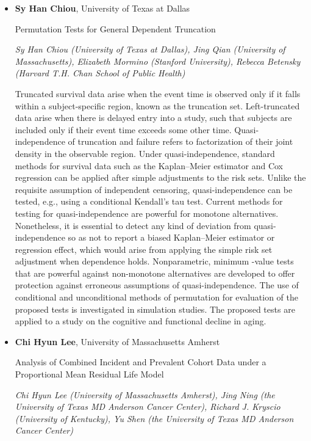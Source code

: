 \begin{itemize}
\item \textbf{Sy Han Chiou}, University of Texas at Dallas

Permutation Tests for General Dependent Truncation

\emph{\footnotesize Sy Han Chiou (University of Texas at Dallas), Jing Qian (University of Massachusetts), Elizabeth Mormino (Stanford University), Rebecca Betensky (Harvard T.H. Chan School of Public Health)}

Truncated survival data arise when the event time is observed only if it falls within a subject-specific region, known as the truncation set. Left-truncated data arise when there is delayed entry into a study, such that subjects are included only if their event time exceeds some other time. Quasi-independence of truncation and failure refers to factorization of their joint density in the observable region. Under quasi-independence, standard methods for survival data such as the Kaplan–Meier estimator and Cox regression can be applied after simple adjustments to the risk sets. Unlike the requisite assumption of independent censoring, quasi-independence can be tested, e.g., using a conditional Kendall’s tau test. Current methods for testing for quasi-independence are powerful for monotone alternatives. Nonetheless, it is essential to detect any kind of deviation from quasi-independence so as not to report a biased Kaplan–Meier estimator or regression effect, which would arise from applying the simple risk set adjustment when dependence holds. Nonparametric, minimum -value tests that are powerful against non-monotone alternatives are developed to offer protection against erroneous assumptions of quasi-independence. The use of conditional and unconditional methods of permutation for evaluation of the proposed tests is investigated in simulation studies. The proposed tests are applied to a study on the cognitive and functional decline in aging.

\item \textbf{Chi Hyun Lee}, University of Massachusetts Amherst

Analysis of Combined Incident and Prevalent Cohort Data under a Proportional Mean Residual Life Model

\emph{\footnotesize Chi Hyun Lee (University of Massachusetts Amherst), Jing Ning (the University of Texas MD Anderson Cancer Center), Richard J. Kryscio (University of Kentucky), Yu Shen (the University of Texas MD Anderson Cancer Center)}


\end{itemize}
